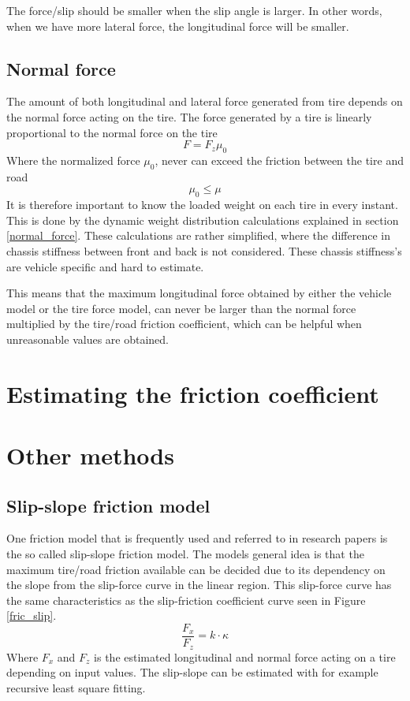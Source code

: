  The force/slip should be smaller when the slip angle is larger. In other words, when we have more lateral force, the longitudinal force will be smaller.

\subsection{Normal force}

The amount of both longitudinal and lateral force generated from tire depends on the normal force acting on the tire. The force generated by a tire is linearly proportional to the normal force on the tire
\begin{equation}
	F = F_{z}\mu_{0}
\end{equation}
Where the normalized force $ \mu_{0} $, never can exceed the friction between the tire and road
\begin{equation}
	\mu_{0} \leq \mu
\end{equation}
It is therefore important to know the loaded weight on each tire in every instant. This is done by the dynamic weight distribution calculations explained in section \ref{normal_force}. These calculations are rather simplified, where the difference in chassis stiffness between front and back is not considered. These chassis stiffness's are vehicle specific and hard to estimate. 

This means that the maximum longitudinal force obtained by either the vehicle model or the tire force model, can never be larger than the normal force multiplied by the tire/road friction coefficient, which can be helpful when unreasonable values are obtained. 

\section{Estimating the friction coefficient}

\section{Other methods}

\subsection{Slip-slope friction model}

One friction model that is frequently used and referred to in research papers is the so called slip-slope friction model. The models general idea is that the maximum tire/road friction available can be decided due to its dependency on the slope from the slip-force curve in the linear region. This slip-force curve has the same characteristics as the slip-friction coefficient curve seen in Figure \ref{fric_slip}. 
\begin{equation}
\dfrac{F_{x}}{F_{z}} = k \cdot \kappa
\end{equation}
Where $ F_{x} $ and $ F_{z} $ is the estimated longitudinal and normal force acting on a tire depending on input values. The slip-slope can be estimated with for example recursive least square fitting.
